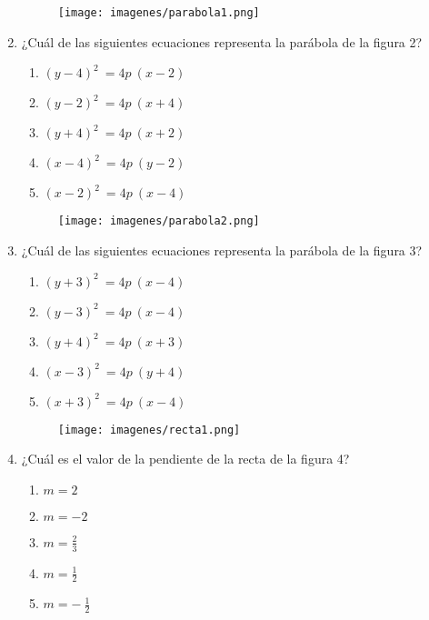 \documentclass[12pt]{article}
\begin{document}
\begin{enumerate}
\begin{figure}[h]
\centering
\texttt{[image: imagenes/parabola1.png]} 
\caption{}
\label{etiqueta1}
\end{figure}

\item  ¿Cuál de las siguientes ecuaciones representa la parábola de la figura 2?
\begin{enumerate}
    \item $ (y-4)^2 \ = 4p \ (x-2) $
    \item $ (y-2)^2 \ = 4p \ (x+4) $  
    \item $ (y+4)^2 \ = 4p \ (x+2) $
    \item $ (x-4)^2 \ = 4p \ (y-2) $  
    \item $ (x-2)^2 \ = 4p \ (x-4) $
    \end{enumerate}

\begin{figure}[h]
\centering
\texttt{[image: imagenes/parabola2.png]} 
\caption{}
\label{etiqueta2}
\end{figure}

\item  ¿Cuál de las siguientes ecuaciones representa la parábola de la figura 3? \\
\begin{enumerate}
    \item $ (y+3)^2 \ = 4p \ (x-4) $
    \item $ (y-3)^2 \ = 4p \ (x-4) $  
    \item $ (y+4)^2 \ = 4p \ (x+3) $
    \item $ (x-3)^2 \ = 4p \ (y+4) $  
    \item $ (x+3)^2 \ = 4p \ (x-4) $
    \end{enumerate}
    
\begin{figure}[h]
\centering
\texttt{[image: imagenes/recta1.png]} 
\caption{}
\label{etiqueta3}
\end{figure}

\item  ¿Cuál es el valor de la pendiente de la recta de la figura 4? \\
\begin{enumerate}
    \item $ m=2 $
    \item $ m=- 2 $  
    \item $ m= \frac{2}{3} $
    \item $ m= \frac{1}{2} $  
    \item $ m= -\ \frac{1}{2} $
    \end{enumerate}


\end{enumerate}
\end{document}
